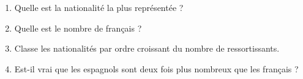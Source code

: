 \begin{pageParcoursu}
\begin{minipage}{0.48\linewidth}
\begin{enumerate}[leftmargin=*]
\item Quelle est la nationalité la plus représentée ?
\item Quelle est le nombre de français ? 
\item Classe les nationalités par ordre croissant du nombre de ressortissants.
\item Est-il vrai que les espagnols sont deux fois plus nombreux que les français ?
\end{enumerate}
\end{minipage}


 
 
\end{pageParcoursu}


